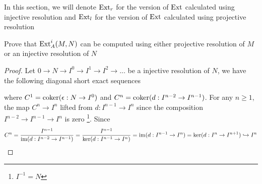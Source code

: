 In this section, we will denote $\operatorname{Ext}_r$ for the version of $\operatorname{Ext}$ calculated using injective resolution and $\operatorname{Ext}_l$ for the version of $\operatorname{Ext}$ calculated using projective resolution

\begin{problem}[problem 6]
	Prove that $\operatorname{Ext}_A^i(M, N)$ can be computed using either projective resolution of $M$ or an injective resolution of $N$
\end{problem}

\begin{proof}
	Let $0 \to N \to I^0 \to I^1 \to I^2 \to ...$ be a injective resolution of $N$, we have the following diagonal short exact sequences
	\begin{center}
	\end{center}
	
	where $C^1 = \operatorname{coker}(\epsilon: N \to I^0)$ and $C^n = \operatorname{coker} (d: I^{n-2} \to I^{n-1})$. For any $n \geq 1$, the map $C^n \to I^n$ lifted from $d: I^{n-1} \to I^n$ since the composition $I^{n-2} \to I^{n-1} \to I^n$ is zero \footnote{$I^{-1} = N$}. Since 
	$$
		C^n  = \frac{I^{n-1}}{\operatorname{im} (d: I^{n-2} \to I^{n-1})} = \frac{I^{n-1}}{\ker (d: I^{n-1} \to I^n)} = \operatorname{im} (d: I^{n-1} \to I^n) = \ker (d: I^n \to I^{n+1}) \hookrightarrow I^n
	$$
	

\end{proof}
